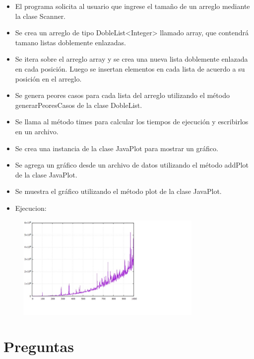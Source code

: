 \documentclass{article}
\begin{document}
	\begin{itemize}
		\item El programa solicita al usuario que ingrese el tamaño de un arreglo mediante la clase Scanner.
		\item Se crea un arreglo de tipo DobleList<Integer> llamado array, que contendrá tamano listas doblemente enlazadas.
		\item Se itera sobre el arreglo array y se crea una nueva lista doblemente enlazada en cada posición. Luego se insertan elementos en cada lista de acuerdo a su posición en el arreglo.	
		\item Se genera peores casos para cada lista del arreglo utilizando el método generarPeoresCasos de la clase DobleList.
		\item Se llama al método times para calcular los tiempos de ejecución y escribirlos en un archivo.
		\item Se crea una instancia de la clase JavaPlot para mostrar un gráfico.
		\item Se agrega un gráfico desde un archivo de datos utilizando el método addPlot de la clase JavaPlot.	
		\item Se muestra el gráfico utilizando el método plot de la clase JavaPlot.
		\item Ejecucion:
	\end{itemize}
	
	\begin{figure}[H]
		\centering
		\includegraphics[width=0.8\textwidth,keepaspectratio]{img/ej3.jpg}
	\end{figure}
	
	\section{Preguntas}
\end{document}
